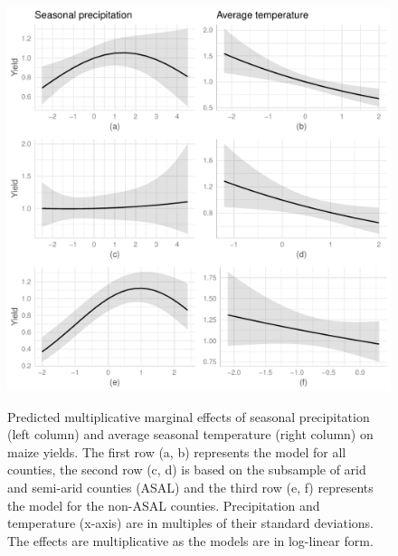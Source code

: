\documentclass[12pt]{iopart}
\begin{document}
  \begin{figure}%
   \includegraphics{Figure1a_1f.pdf}\label{MarEff1}
\caption{Predicted multiplicative marginal effects of seasonal precipitation (left column) and average seasonal temperature (right column) on maize yields. The first row (a, b) represents the model for all counties, the second row (c, d) is based on the subsample of arid and semi-arid counties (ASAL) and the third row (e, f) represents the model for the non-ASAL counties. Precipitation and temperature (x-axis) are in multiples of their standard deviations. The effects are multiplicative as the models are in log-linear form.}
\end{figure}
\end{document}
